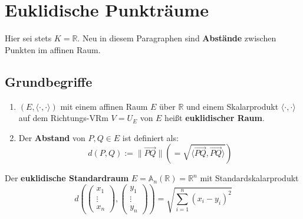 \documentclass[parskip,a4paper,twoside,DIV15,BCOR12mm]{scrbook}
\begin{document}
\chapter{Euklidische Punkträume}

Hier sei stets $K=\mathbb{R}$. Neu in diesem Paragraphen sind \textbf{Abstände} zwischen 
Punkten im affinen Raum.

\section{Grundbegriffe}

\begin{definition}
\renewcommand{\labelenumi}{(\alph{enumi})}
\begin{enumerate}
\item $(E,\langle\cdot,\cdot\rangle)$ mit einem affinen Raum $E$ über $\mathbb{R}$
und einem Skalarprodukt $\langle\cdot,\cdot\rangle$ auf dem Richtungs-VRm $V=U_E$ 
von $E$ heißt \textbf{euklidischer Raum}.
\item Der \textbf{Abstand} von $P,Q\in E$ ist definiert als:
\[d(P,Q):=\|\overrightarrow{PQ}\| \left(=\sqrt{\langle\overrightarrow{PQ},\overrightarrow{PQ}\rangle}\right)\]
\end{enumerate}
\renewcommand{\labelenumi}{(\arabic{enumi})}
\end{definition}

\begin{example}
Der \textbf{euklidische Standardraum} $E=\mathbb{A}_n(\mathbb{R})=\mathbb{R}^n$ mit Standardskalarprodukt
\[d(\begin{pmatrix}x_1\\\vdots\\x_n\end{pmatrix},\begin{pmatrix}y_1\\\vdots\\y_n\end{pmatrix})
=\sqrt{\sum_{i=1}^n(x_i-y_i)^2}\]
\end{example}

\begin{comment}
Der Abstand $d$ eines euklidischen Raums $E$ definiert eine Metrik auf $E$ (Positivdefinitheit, Symmetrie
und Dreiecksungleichung).
\end{comment}
\end{document}
